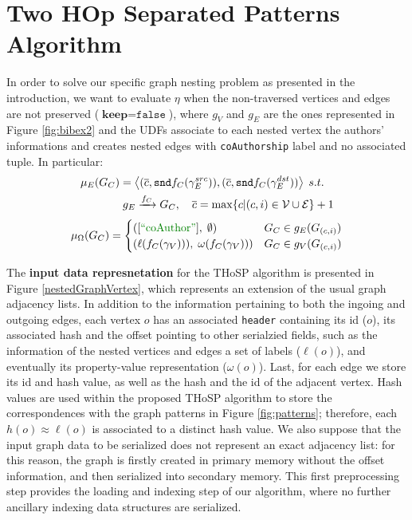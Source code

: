 \section{Two HOp Separated Patterns Algorithm}
\label{sec:THOSPA}
In order to solve our specific graph nesting problem as presented in the introduction, we want to evaluate $\eta$ when the non-traversed vertices and edges are not preserved ($\textbf{keep}=\texttt{false}$), where $g_V$ and $g_E$ are the ones represented in Figure \ref{fig:bibex2} and the UDFs associate to each nested vertex the authors' informations and creates nested edges with \texttt{coAuthorship} label and no associated tuple. In particular:
\[\begin{split}
\mu_E(G_C)&=\Braket{(\overline{c},\texttt{snd}f_C(\gamma_E^{src})),(\overline{c},\texttt{snd}f_C(\gamma_E^{dst}))}\; s.t.\\
&\; g_E\xrightarrow{f_C}G_C,\quad \overline{c}=\max\{c|(c,i)\in\mathcal{V}\cup\mathcal{E}\}+1\\
\end{split}\]
\[\mu_\Omega(G_C)=\begin{cases}
([\mstr{coAuthor}],\;\emptyset) & G_C \in g_E(G_{(c,i)})\\
(\ell(f_C(\gamma_V))),\;\omega(f_C(\gamma_V))) & G_C \in g_V(G_{(c,i)})\\
\end{cases}\]


The \textbf{input data  represnetation} for the THoSP algorithm is presented in Figure \ref{nestedGraphVertex}, which represents an  extension of the usual graph adjacency lists. In addition to the information pertaining to both the ingoing and outgoing edges, each vertex $o$ has an associated \texttt{header} containing its id ($o$), its associated hash and the offset pointing to other serialzied fields, such as the information of the  nested vertices and edges a set of labels ($\ell(o)$), and eventually its property-value representation ($\omega(o)$). Last, for each edge we store its id and hash value, as well as the hash and the id of the adjacent vertex. Hash values are used within the proposed THoSP algorithm to store the correspondences with the graph patterns in Figure \ref{fig:patterns}; therefore, each $h(o)\approx \ell(o)$ is associated to a distinct hash value. We also suppose that the input graph data to be serialized does not represent an exact adjacency list: for this reason, the graph is firstly created in primary memory without the offset information, and then serialized into secondary memory. This first preprocessing step provides the loading and indexing step of our algorithm, where no further ancillary indexing data structures are serialized.









